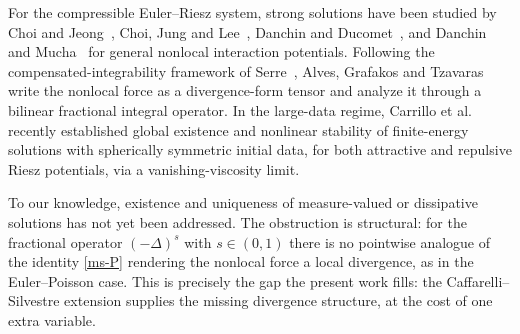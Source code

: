 \documentclass[12pt,a4paper,twoside]{article}
\numberwithin{equation}{section}%
\begin{document}
For the compressible Euler--Riesz system, strong solutions have been studied by Choi and
Jeong~\cite{CJ2022}, Choi, Jung and Lee~\cite{CJL2025}, Danchin and Ducomet~\cite{DD2022}, and
Danchin and Mucha~\cite{DM2024} for general nonlocal interaction potentials. Following the
compensated-integrability framework of Serre~\cite{S2019}, Alves, Grafakos and
Tzavaras~\cite{AlGT2026} write the nonlocal force as a divergence-form tensor and analyze it
through a bilinear fractional integral operator. In the large-data regime,
Carrillo et al.~\cite{CCCY2025} recently established global existence and nonlinear stability of
finite-energy solutions with spherically symmetric initial data, for both attractive and
repulsive Riesz potentials, via a vanishing-viscosity limit. \par

To our knowledge, existence and uniqueness of measure-valued or dissipative solutions has not yet
been addressed. The obstruction is structural: for the fractional operator $(-\Delta)^s$ with
$s\in(0,1)$ there is no pointwise analogue of the identity \eqref{ms-P} rendering the nonlocal
force a local divergence, as in the Euler--Poisson case. This is precisely the gap the present
work fills: the Caffarelli--Silvestre extension supplies the missing divergence structure, at the
cost of one extra variable. \par
\end{document}
